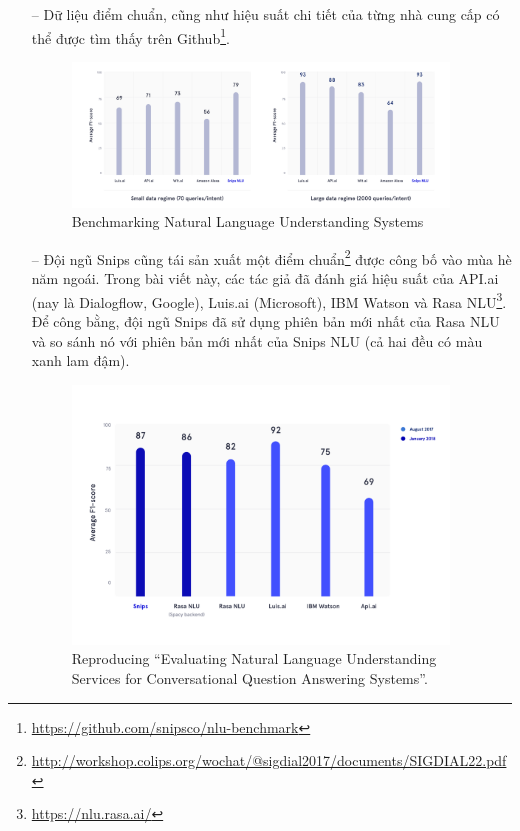 \begin{itemize}
\begin{figure}[htp]
            \label{fig:system-class-intent}
        \end{figure}


        \item[--]Dữ liệu điểm chuẩn, cũng như hiệu suất chi tiết của từng nhà cung cấp có thể được tìm thấy trên Github\footnote{\url{https://github.com/snipsco/nlu-benchmark}}.

        \begin{figure}[htp]
            \centering
            \includegraphics[width=10cm]{images/ComparisonOfNLU/benchmarking.png}
            \caption{Benchmarking Natural Language Understanding Systems}
            \label{fig:system-class-intent}
        \end{figure}

        \item[--]Đội ngũ Snips cũng tái sản xuất một điểm chuẩn\footnote{\url{http://workshop.colips.org/wochat/@sigdial2017/documents/SIGDIAL22.pdf}} được công bố vào mùa hè năm ngoái. Trong bài viết này, các tác giả đã đánh giá hiệu suất của API.ai (nay là Dialogflow, Google), Luis.ai (Microsoft), IBM Watson và Rasa NLU\footnote{\url{https://nlu.rasa.ai/}}. Để công bằng, đội ngũ Snips đã sử dụng phiên bản mới nhất của Rasa NLU và so sánh nó với phiên bản mới nhất của Snips NLU (cả hai đều có màu xanh lam đậm).

        \begin{figure}[htp]
            \centering
            \includegraphics[width=10cm]{images/ComparisonOfNLU/Reproducing.png}
            \caption{Reproducing “Evaluating Natural Language Understanding Services for Conversational Question Answering Systems”.}
            \label{fig:system-class-intent}
        \end{figure}


\end{itemize}
